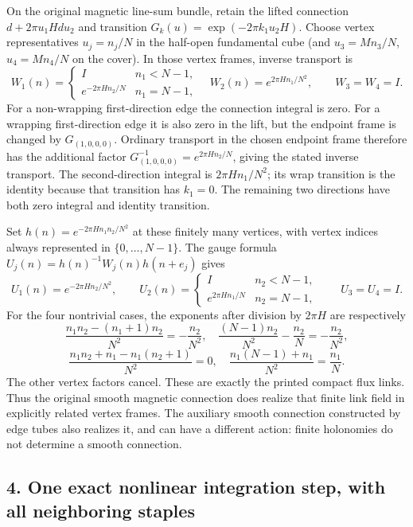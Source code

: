 \documentclass[
  11pt,
]{article}
\begin{document}
On the original magnetic line-sum bundle, retain the lifted connection
\(d+2\pi u_1Hdu_2\) and transition \(G_k(u)=\exp(-2\pi k_1u_2H)\).
Choose vertex representatives \(u_j=n_j/N\) in the half-open fundamental
cube (and \(u_3=Mn_3/N\), \(u_4=Mn_4/N\) on the cover). In those vertex
frames, inverse transport is \[
 W_1(n)=\begin{cases}I&n_1<N-1,\\
 e^{-2\pi Hn_2/N}&n_1=N-1,\end{cases}\quad
 W_2(n)=e^{2\pi Hn_1/N^2},\qquad W_3=W_4=I.
\] For a non-wrapping first-direction edge the connection integral is
zero. For a wrapping first-direction edge it is also zero in the lift,
but the endpoint frame is changed by \(G_{(1,0,0,0)}\). Ordinary
transport in the chosen endpoint frame therefore has the additional
factor \(G_{(1,0,0,0)}^{-1}=e^{2\pi Hn_2/N}\), giving the stated inverse
transport. The second-direction integral is \(2\pi H n_1/N^2\); its wrap
transition is the identity because that transition has \(k_1=0\). The
remaining two directions have both zero integral and identity
transition.

Set \(h(n)=e^{-2\pi Hn_1n_2/N^2}\) at these finitely many vertices, with
vertex indices always represented in \(\{0,\ldots,N-1\}\). The gauge
formula \(U_j(n)=h(n)^{-1}W_j(n)h(n+e_j)\) gives \[
 U_1(n)=e^{-2\pi Hn_2/N^2},\qquad
 U_2(n)=\begin{cases}I&n_2<N-1,\\
 e^{2\pi Hn_1/N}&n_2=N-1,\end{cases}\qquad U_3=U_4=I.
\] For the four nontrivial cases, the exponents after division by
\(2\pi H\) are respectively \[
 \frac{n_1n_2-(n_1+1)n_2}{N^2}=-\frac{n_2}{N^2},\quad
 \frac{(N-1)n_2}{N^2}-\frac{n_2}{N}=-\frac{n_2}{N^2},
\] \[
 \frac{n_1n_2+n_1-n_1(n_2+1)}{N^2}=0,\quad
 \frac{n_1(N-1)+n_1}{N^2}=\frac{n_1}{N}.
\] The other vertex factors cancel. These are exactly the printed
compact flux links. Thus the original smooth magnetic connection does
realize that finite link field in explicitly related vertex frames. The
auxiliary smooth connection constructed by edge tubes also realizes it,
and can have a different action: finite holonomies do not determine a
smooth connection.

\subsection{4. One exact nonlinear integration step, with all
neighboring
staples}\label{one-exact-nonlinear-integration-step-with-all-neighboring-staples}
\end{document}
